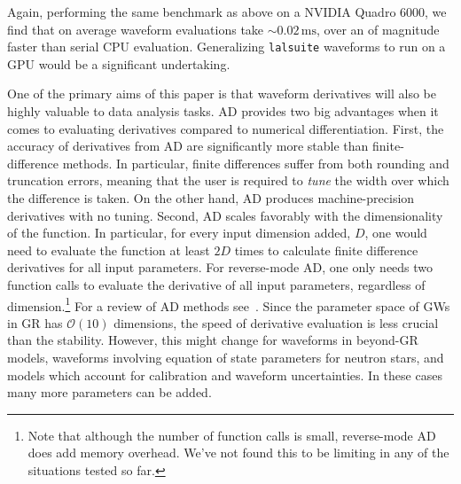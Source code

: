 \documentclass[twocolumn]{aastex631}
\newcommand{\lalsuite}{\texttt{lalsuite}\xspace}
\newcommand{\te}[1]{\textbf{\color{pyGreen}(TE: #1)}}
\newcommand{\kw}[1]{{\color{rb4}[KW: #1 ]}}
\newcommand{\amc}[1]{{\color{red}[AC: #1]}}
\begin{document}

Again, performing the same benchmark as above on a NVIDIA Quadro 6000, we find that on average waveform evaluations take $\sim 0.02\,\mathrm{ms}$, over an of magnitude faster than serial CPU evaluation.
Generalizing \lalsuite waveforms to run on a GPU would be a significant undertaking.

One of the primary aims of this paper is that waveform derivatives will also be highly valuable to data analysis tasks. 
AD provides two big advantages when it comes to evaluating derivatives compared to numerical differentiation.
First, the accuracy of derivatives from AD are significantly more stable than finite-difference methods.
In particular, finite differences suffer from both rounding and truncation errors, meaning that the user is required to \textit{tune} the width over which the difference is taken.
On the other hand, AD produces machine-precision derivatives with no tuning.
Second, AD scales favorably with the dimensionality of the function.
In particular, for every input dimension added, $D$, one would need to evaluate the function at least $2D$ times to calculate finite difference derivatives for all input parameters.
For reverse-mode AD, one only needs two function calls to evaluate the derivative of all input parameters, regardless of dimension.\footnote{
    Note that although the number of function calls is small, reverse-mode AD does add memory overhead.
    We've not found this to be limiting in any of the situations tested so far.
}
For a review of AD methods see~\cite{2018arXiv181105031M}.
Since the parameter space of GWs in GR has $\mathcal{O}(10)$ dimensions, the speed of derivative evaluation is less crucial than the stability.
However, this might change for waveforms in beyond-GR models, waveforms involving equation of state parameters for neutron stars, and models which account for calibration and waveform uncertainties.
In these cases many more parameters can be added.
\end{document}
